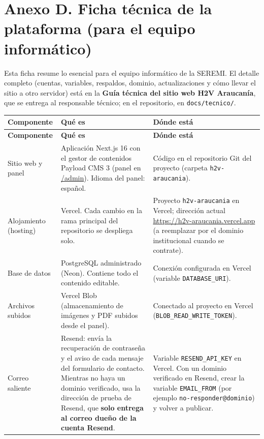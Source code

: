 \documentclass[11pt,letterpaper]{report}
\begin{document}
\section{Anexo D. Ficha técnica de la plataforma (para el equipo informático)}
Esta ficha resume lo esencial para el equipo informático de la SEREMI. El detalle completo (cuentas, variables, respaldos, dominio, actualizaciones y cómo llevar el sitio a otro servidor) está en la \textbf{Guía técnica del sitio web H2V Araucanía}, que se entrega al responsable técnico; en el repositorio, en \texttt{docs/tecnico/}.

\begin{longtable}{>{\raggedright\arraybackslash}p{}>{\raggedright\arraybackslash}p{}>{\raggedright\arraybackslash}p{}}
\rowcolor{h2vazul}\textbf{\color{white}Componente} & \textbf{\color{white}Qué es} & \textbf{\color{white}Dónde está} \\
\endfirsthead
\rowcolor{h2vazul}\textbf{\color{white}Componente} & \textbf{\color{white}Qué es} & \textbf{\color{white}Dónde está} \\
\endhead
Sitio web y panel & Aplicación Next.js 16 con el gestor de contenidos Payload CMS 3 (panel en \url{/admin}). Idioma del panel: español. & Código en el repositorio Git del proyecto (carpeta \texttt{h2v-araucania}). \\ \midrule
\rowcolor{filaalt}Alojamiento (hosting) & Vercel. Cada cambio en la rama principal del repositorio se despliega solo. & Proyecto \texttt{h2v-araucania} en Vercel; dirección actual \url{https://h2v-araucania.vercel.app} (a reemplazar por el dominio institucional cuando se contrate). \\ \midrule
Base de datos & PostgreSQL administrado (Neon). Contiene todo el contenido editable. & Conexión configurada en Vercel (variable \texttt{DATABASE\_\allowbreak{}URI}). \\ \midrule
\rowcolor{filaalt}Archivos subidos & Vercel Blob (almacenamiento de imágenes y PDF subidos desde el panel). & Conectado al proyecto en Vercel (\texttt{BLOB\_\allowbreak{}READ\_\allowbreak{}WRITE\_\allowbreak{}TOKEN}). \\ \midrule
Correo saliente & Resend: envía la recuperación de contraseña y el aviso de cada mensaje del formulario de contacto. Mientras no haya un dominio verificado, usa la dirección de prueba de Resend, que \textbf{solo entrega al correo dueño de la cuenta Resend}. & Variable \texttt{RESEND\_\allowbreak{}API\_\allowbreak{}KEY} en Vercel. Con un dominio verificado en Resend, crear la variable \texttt{EMAIL\_\allowbreak{}FROM} (por ejemplo \texttt{no-responder@dominio}) y volver a publicar. \\ \midrule

\end{longtable}
\end{document}
